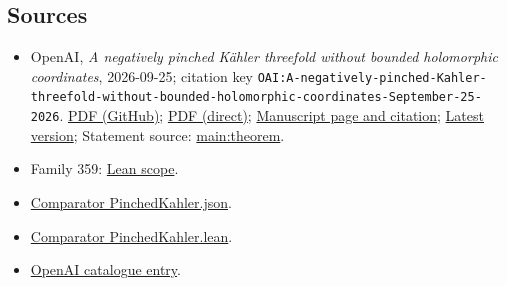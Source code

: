 \documentclass[11pt]{article}
\begin{document}
\subsection{Sources}
\begin{itemize}
\item OpenAI, \emph{A negatively pinched Kähler threefold without bounded holomorphic coordinates}, 2026-09-25; citation key \texttt{OAI:A-negatively-pinched-Kahler-threefold-without-bounded-holomorphic-coordinates-September-25-2026}. \href{https://github.com/openai/math/blob/adc7f1241b42e322a6451854ab7e4b4c146bf78a/preprints/A-negatively-pinched-Kahler-threefold-without-bounded-holomorphic-coordinates-September-25-2026/paper.pdf}{PDF (GitHub)}; \href{https://github.com/openai/math/raw/adc7f1241b42e322a6451854ab7e4b4c146bf78a/preprints/A-negatively-pinched-Kahler-threefold-without-bounded-holomorphic-coordinates-September-25-2026/paper.pdf}{PDF (direct)}; \href{https://github.com/openai/math/blob/adc7f1241b42e322a6451854ab7e4b4c146bf78a/preprints/A-negatively-pinched-Kahler-threefold-without-bounded-holomorphic-coordinates-September-25-2026/README.md}{Manuscript page and citation}; \href{https://github.com/openai/math/blob/main/preprints/A-negatively-pinched-Kahler-threefold-without-bounded-holomorphic-coordinates-September-25-2026/paper.pdf}{Latest version}; Statement source: \href{https://github.com/openai/math/blob/adc7f1241b42e322a6451854ab7e4b4c146bf78a/preprints/A-negatively-pinched-Kahler-threefold-without-bounded-holomorphic-coordinates-September-25-2026/build/sections/01-introduction.tex\#L39}{main:theorem}.
\item Family 359: \href{https://github.com/openai/math/blob/adc7f1241b42e322a6451854ab7e4b4c146bf78a/lean/docs/359.md}{Lean scope}.
\item \href{https://github.com/openai/math/blob/adc7f1241b42e322a6451854ab7e4b4c146bf78a/lean/ComparatorChallenges/PinchedKahler.json}{Comparator PinchedKahler.json}.
\item \href{https://github.com/openai/math/blob/adc7f1241b42e322a6451854ab7e4b4c146bf78a/lean/ComparatorChallenges/PinchedKahler.lean}{Comparator PinchedKahler.lean}.
\item \href{https://github.com/openai/math/blob/adc7f1241b42e322a6451854ab7e4b4c146bf78a/CONTENTS.md}{OpenAI catalogue entry}.
\end{itemize}
\end{document}
